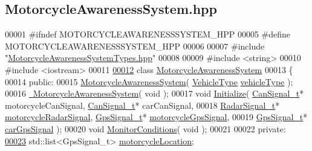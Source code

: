\hypertarget{MotorcycleAwarenessSystem_8hpp_source}{\subsection{Motorcycle\-Awareness\-System.\-hpp}
}

\begin{DoxyCode}
00001 \textcolor{preprocessor}{#ifndef MOTORCYCLEAWARENESSSYSTEM\_HPP}
00005 \textcolor{preprocessor}{}\textcolor{preprocessor}{#define MOTORCYCLEAWARENESSSYSTEM\_HPP}
00006 \textcolor{preprocessor}{}
00007 \textcolor{preprocessor}{#include "\hyperlink{MotorcycleAwarenessSystemTypes_8hpp}{MotorcycleAwarenessSystemTypes.hpp}"}
00008 
00009 \textcolor{preprocessor}{#include <string>}
00010 \textcolor{preprocessor}{#include <iostream>}
00011 
\hypertarget{MotorcycleAwarenessSystem_8hpp_source_l00012}{}\hyperlink{classMotorcycleAwarenessSystem}{00012} \textcolor{keyword}{class }\hyperlink{classMotorcycleAwarenessSystem}{MotorcycleAwarenessSystem}
00013 \{
00014     \textcolor{keyword}{public}:
00015         \hyperlink{classMotorcycleAwarenessSystem_ab0fb3823809dc056fecc82cc72a80a55}{MotorcycleAwarenessSystem}( \hyperlink{MotorcycleAwarenessSystemTypes_8hpp_a0c05c42b98a847f971385c81c2a81afa}{VehicleType} 
      \hyperlink{classMotorcycleAwarenessSystem_a977b2085bfbf6a62902bf2d80160e6d2}{vehicleType} );
00016         \hyperlink{classMotorcycleAwarenessSystem_a89ce16a722b3575e1415cbe9c7eedbd3}{~MotorcycleAwarenessSystem}( \textcolor{keywordtype}{void} );
00017         \textcolor{keywordtype}{void} \hyperlink{classMotorcycleAwarenessSystem_a55f1ea16b6311120ea42b460fb8b3a71}{Initialize}( \hyperlink{structCanSignal__t}{CanSignal\_t}* motorcycleCanSignal, 
      \hyperlink{structCanSignal__t}{CanSignal\_t}* carCanSignal,
00018                          \hyperlink{structRadarSignal__t}{RadarSignal\_t}* \hyperlink{classMotorcycleAwarenessSystem_a0744e71b9f440a86f5078c876ba7629b}{motorcycleRadarSignal}, 
      \hyperlink{structGpsSignal__t}{GpsSignal\_t}* \hyperlink{classMotorcycleAwarenessSystem_ab281a3993b574923b2f379ed0477b2d4}{motorcycleGpsSignal},
00019                          \hyperlink{structGpsSignal__t}{GpsSignal\_t}* \hyperlink{classMotorcycleAwarenessSystem_a9a8185e00b60d0be58bfa76166063128}{carGpsSignal} );
00020         \textcolor{keywordtype}{void} \hyperlink{classMotorcycleAwarenessSystem_afb19e832c17d43941d9ed6c4f4435a2e}{MonitorConditions}( \textcolor{keywordtype}{void} );
00021 
00022     \textcolor{keyword}{private}:
\hypertarget{MotorcycleAwarenessSystem_8hpp_source_l00023}{}\hyperlink{classMotorcycleAwarenessSystem_af6becfeb1d11b467cb80a94a8e6940ac}{00023}         std::list<GpsSignal\_t> \hyperlink{classMotorcycleAwarenessSystem_af6becfeb1d11b467cb80a94a8e6940ac}{motorcycleLocation}; 

\end{DoxyCode}

